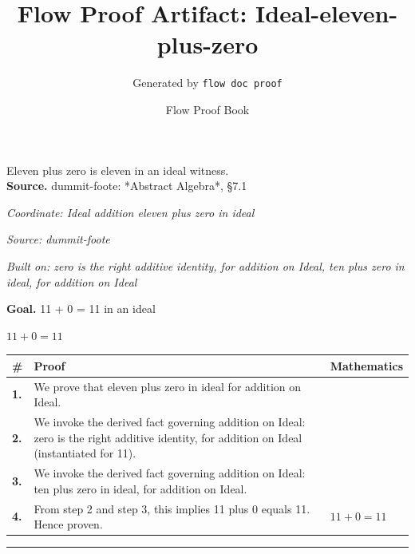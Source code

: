 \documentclass[11pt]{article}
\title{Flow Proof Artifact: Ideal-eleven-plus-zero}
\author{Generated by \texttt{flow doc proof}}
\date{Flow Proof Book}
\theoremstyle{definition}
\begin{document}
\maketitle
Eleven plus zero is eleven in an ideal witness.\\[0.5em]
\textbf{Source.} dummit-foote: *Abstract Algebra*, §7.1\\[0.5em]
\bigskip
{}\par
\smallskip\noindent\textit{Coordinate: Ideal \cdot addition \cdot eleven plus zero in ideal}\par
\smallskip\noindent\textit{Source: dummit-foote}\par
\smallskip\noindent\textit{Built on: zero is the right additive identity, for addition on Ideal, ten plus zero in ideal, for addition on Ideal}\par
\medskip
\noindent\textbf{Goal.} 11 + 0 = 11 in an ideal\par
\noindent$\displaystyle 11 + 0 = 11$\par
\medskip
\noindent
\begin{tabular}{@{} >{\raggedright\arraybackslash}p{} >{\raggedright\arraybackslash}p{} >{\raggedleft\arraybackslash}p{} @{}}
\textbf{\#} & \textbf{Proof} & \textbf{Mathematics} \\
\midrule
\textbf{1.} & We prove that eleven plus zero in ideal for addition on Ideal. & \\[0.45em]
\textbf{2.} & We invoke the derived fact governing addition on Ideal: zero is the right additive identity, for addition on Ideal (instantiated for 11). & \\[0.45em]
\textbf{3.} & We invoke the derived fact governing addition on Ideal: ten plus zero in ideal, for addition on Ideal. & \\[0.45em]
\textbf{4.} & From step 2 and step 3, this implies 11 plus 0 equals 11. Hence proven. & $\displaystyle 11 + 0 = 11$ \\[0.45em]
\bottomrule
\end{tabular}
\label{thm:Ideal-addition-eleven_plus_zero_in_ideal}
\par\medskip\hrule
\end{document}
